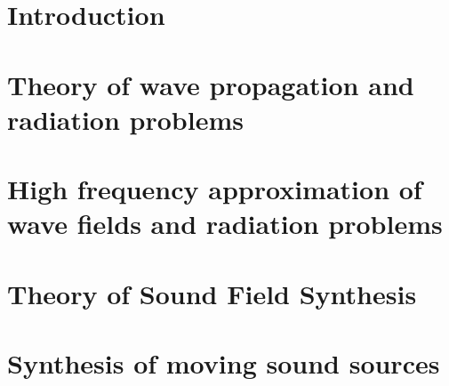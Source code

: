 \documentclass[%
	paper=A4,					%
	twoside=true,				%
	openright,					%
	chapterprefix=true,			%
	11pt,						%
	headings=normal,			%
	bibliography=totoc,			%
	listof=totoc,				%
	titlepage=on,				%
	captions=tableabove,		%
	draft=false,				%
]{scrreprt}
\begin{document}


\pagestyle{empty}				%
\cleardoublepage

\pagestyle{plain}				%
\setcounter{tocdepth}{2}		%
\tableofcontents				%
\cleardoublepage
{}			%
\setcounter{page}{1}			%
\pagestyle{maincontentstyle} 	%

%
%
\chapter{Introduction}
\label{sec:introduction}


\chapter{Theory of wave propagation and radiation problems}
\label{sec:general_wave_theory}

%
%
\chapter{High frequency approximation of wave fields and radiation problems}
\label{sec:high_freq_approx}


\chapter{Theory of Sound Field Synthesis}
\label{sec:sound_field_synthesis}


\chapter{Synthesis of moving sound sources}
\label{sec:moving_source_synthesis}

%
\end{document}
